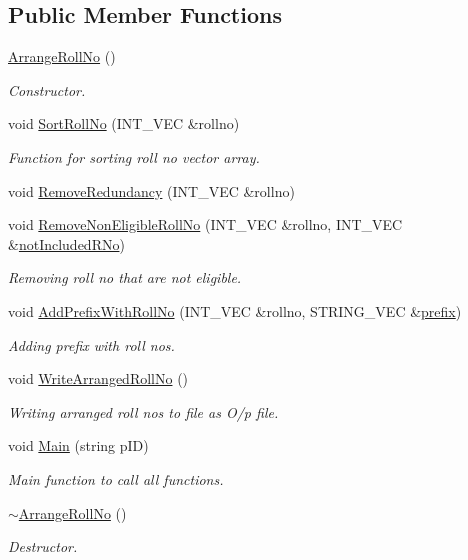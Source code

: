 \subsection*{\-Public \-Member \-Functions}
\begin{DoxyCompactItemize}
\item 
\hyperlink{classArrangeRollNo_a430515990d97ffa02b65ed5d15d79c9f}{\-Arrange\-Roll\-No} ()
\begin{DoxyCompactList}\small\item\em \-Constructor. \end{DoxyCompactList}\item 
void \hyperlink{classArrangeRollNo_aae9734fb7b98d980d3f1feb1b52a6195}{\-Sort\-Roll\-No} (\-I\-N\-T\-\_\-\-V\-E\-C \&rollno)
\begin{DoxyCompactList}\small\item\em \-Function for sorting roll no vector array. \end{DoxyCompactList}\item 
void \hyperlink{classArrangeRollNo_ab0b6350a9113b86925133d7199929020}{\-Remove\-Redundancy} (\-I\-N\-T\-\_\-\-V\-E\-C \&rollno)
\item 
void \hyperlink{classArrangeRollNo_adeb652c1977c668d2cd519c1a4f317bd}{\-Remove\-Non\-Eligible\-Roll\-No} (\-I\-N\-T\-\_\-\-V\-E\-C \&rollno, \-I\-N\-T\-\_\-\-V\-E\-C \&\hyperlink{classArrangeRollNo_a1f6740950e3180731b74c3ecdc19b98c}{not\-Included\-R\-No})
\begin{DoxyCompactList}\small\item\em \-Removing roll no that are not eligible. \end{DoxyCompactList}\item 
void \hyperlink{classArrangeRollNo_a69151212acbfeb90780b066ade988418}{\-Add\-Prefix\-With\-Roll\-No} (\-I\-N\-T\-\_\-\-V\-E\-C \&rollno, \-S\-T\-R\-I\-N\-G\-\_\-\-V\-E\-C \&\hyperlink{classArrangeRollNo_ac70b1f6e601cc5786ef339a38ae18c6f}{prefix})
\begin{DoxyCompactList}\small\item\em \-Adding prefix with roll nos. \end{DoxyCompactList}\item 
void \hyperlink{classArrangeRollNo_a12e17989e12519e37083b7f5649ebbec}{\-Write\-Arranged\-Roll\-No} ()
\begin{DoxyCompactList}\small\item\em \-Writing arranged roll nos to file as \-O/p file. \end{DoxyCompactList}\item 
void \hyperlink{classArrangeRollNo_a795fde3b512631e07d7189138b39b775}{\-Main} (string p\-I\-D)
\begin{DoxyCompactList}\small\item\em \-Main function to call all functions. \end{DoxyCompactList}\item 
\hyperlink{classArrangeRollNo_acbdaa06590d381ec19a7a07c718b9282}{$\sim$\-Arrange\-Roll\-No} ()
\begin{DoxyCompactList}\small\item\em \-Destructor. \end{DoxyCompactList}\end{DoxyCompactItemize}
